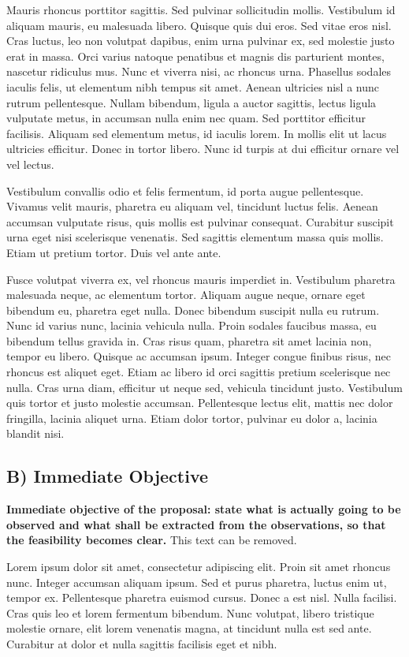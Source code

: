 \documentclass{article}
\begin{document}
Mauris rhoncus porttitor sagittis. Sed pulvinar sollicitudin mollis. Vestibulum id aliquam mauris, eu malesuada libero. Quisque quis dui eros. Sed vitae eros nisl. Cras luctus, leo non volutpat dapibus, enim urna pulvinar ex, sed molestie justo erat in massa. Orci varius natoque penatibus et magnis dis parturient montes, nascetur ridiculus mus. Nunc et viverra nisi, ac rhoncus urna.
Phasellus sodales iaculis felis, ut elementum nibh tempus sit amet. Aenean ultricies nisl a nunc rutrum pellentesque. Nullam bibendum, ligula a auctor sagittis, lectus ligula vulputate metus, in accumsan nulla enim nec quam. Sed porttitor efficitur facilisis. Aliquam sed elementum metus, id iaculis lorem. In mollis elit ut lacus ultricies efficitur. Donec in tortor libero. Nunc id turpis at dui efficitur ornare vel vel lectus.

Vestibulum convallis odio et felis fermentum, id porta augue pellentesque. Vivamus velit mauris, pharetra eu aliquam vel, tincidunt luctus felis. Aenean accumsan vulputate risus, quis mollis est pulvinar consequat. Curabitur suscipit urna eget nisi scelerisque venenatis. Sed sagittis elementum massa quis mollis. Etiam ut pretium tortor. Duis vel ante ante.

Fusce volutpat viverra ex, vel rhoncus mauris imperdiet in. Vestibulum pharetra malesuada neque, ac elementum tortor. Aliquam augue neque, ornare eget bibendum eu, pharetra eget nulla. Donec bibendum suscipit nulla eu rutrum. Nunc id varius nunc, lacinia vehicula nulla. Proin sodales faucibus massa, eu bibendum tellus gravida in. Cras risus quam, pharetra sit amet lacinia non, tempor eu libero. Quisque ac accumsan ipsum. Integer congue finibus risus, nec rhoncus est aliquet eget. Etiam ac libero id orci sagittis pretium scelerisque nec nulla. Cras urna diam, efficitur ut neque sed, vehicula tincidunt justo. Vestibulum quis tortor et justo molestie accumsan. Pellentesque lectus elit, mattis nec dolor fringilla, lacinia aliquet urna. Etiam dolor tortor, pulvinar eu dolor a, lacinia blandit nisi.

\subsection{B) Immediate Objective}
{\bf Immediate objective of the proposal: state what is actually going to be observed and what shall be extracted from the observations, so that the feasibility becomes clear.} This text can be removed.

Lorem ipsum dolor sit amet, consectetur adipiscing elit. Proin sit amet rhoncus nunc. Integer accumsan aliquam ipsum. Sed et purus pharetra, luctus enim ut, tempor ex. Pellentesque pharetra euismod cursus. Donec a est nisl. Nulla facilisi. Cras quis leo et lorem fermentum bibendum. Nunc volutpat, libero tristique molestie ornare, elit lorem venenatis magna, at tincidunt nulla est sed ante. Curabitur at dolor et nulla sagittis facilisis eget et nibh.
\end{document}
